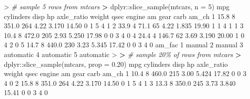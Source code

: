 \documentclass[
]{book}
\newenvironment{Shaded}{\begin{snugshade}}{\end{snugshade}}
\newcommand{\AttributeTok}[1]{\textcolor[rgb]{0.77,0.63,0.00}{#1}}
\newcommand{\CommentTok}[1]{\textcolor[rgb]{0.56,0.35,0.01}{\textit{#1}}}
\newcommand{\DecValTok}[1]{\textcolor[rgb]{0.00,0.00,0.81}{#1}}
\newcommand{\ErrorTok}[1]{\textcolor[rgb]{0.64,0.00,0.00}{\textbf{#1}}}
\newcommand{\FloatTok}[1]{\textcolor[rgb]{0.00,0.00,0.81}{#1}}
\newcommand{\FunctionTok}[1]{\textcolor[rgb]{0.00,0.00,0.00}{#1}}
\newcommand{\NormalTok}[1]{#1}
\newcommand{\SpecialCharTok}[1]{\textcolor[rgb]{0.00,0.00,0.00}{#1}}
\begin{document}
\begin{Shaded}
\begin{Highlighting}[]
\SpecialCharTok{\textgreater{}} \CommentTok{\# sample 5 rows from mtcars}
\ErrorTok{\textgreater{}}\NormalTok{ dplyr}\SpecialCharTok{::}\FunctionTok{slice\_sample}\NormalTok{(mtcars, }\AttributeTok{n =} \DecValTok{5}\NormalTok{)}
\NormalTok{   mpg cylinders  disp  hp axle\_ratio weight  qsec engine am gear carb am\_ch}
\DecValTok{1} \FloatTok{15.8}         \DecValTok{8} \FloatTok{351.0} \DecValTok{264}       \FloatTok{4.22}  \FloatTok{3.170} \FloatTok{14.50}      \DecValTok{0}  \DecValTok{1}    \DecValTok{5}    \DecValTok{4}     \DecValTok{1}
\DecValTok{2} \FloatTok{33.9}         \DecValTok{4}  \FloatTok{71.1}  \DecValTok{65}       \FloatTok{4.22}  \FloatTok{1.835} \FloatTok{19.90}      \DecValTok{1}  \DecValTok{1}    \DecValTok{4}    \DecValTok{1}     \DecValTok{1}
\DecValTok{3} \FloatTok{10.4}         \DecValTok{8} \FloatTok{472.0} \DecValTok{205}       \FloatTok{2.93}  \FloatTok{5.250} \FloatTok{17.98}      \DecValTok{0}  \DecValTok{0}    \DecValTok{3}    \DecValTok{4}     \DecValTok{0}
\DecValTok{4} \FloatTok{24.4}         \DecValTok{4} \FloatTok{146.7}  \DecValTok{62}       \FloatTok{3.69}  \FloatTok{3.190} \FloatTok{20.00}      \DecValTok{1}  \DecValTok{0}    \DecValTok{4}    \DecValTok{2}     \DecValTok{0}
\DecValTok{5} \FloatTok{14.7}         \DecValTok{8} \FloatTok{440.0} \DecValTok{230}       \FloatTok{3.23}  \FloatTok{5.345} \FloatTok{17.42}      \DecValTok{0}  \DecValTok{0}    \DecValTok{3}    \DecValTok{4}     \DecValTok{0}
\NormalTok{     am\_fac}
\DecValTok{1}\NormalTok{    manual}
\DecValTok{2}\NormalTok{    manual}
\DecValTok{3}\NormalTok{ automatic}
\DecValTok{4}\NormalTok{ automatic}
\DecValTok{5}\NormalTok{ automatic}
\SpecialCharTok{\textgreater{}} 
\ErrorTok{\textgreater{}} \CommentTok{\# sample 20\% of rows from mtcars}
\ErrorTok{\textgreater{}}\NormalTok{ dplyr}\SpecialCharTok{::}\FunctionTok{slice\_sample}\NormalTok{(mtcars, }\AttributeTok{prop =} \FloatTok{0.20}\NormalTok{)}
\NormalTok{   mpg cylinders  disp  hp axle\_ratio weight  qsec engine am gear carb am\_ch}
\DecValTok{1} \FloatTok{10.4}         \DecValTok{8} \FloatTok{460.0} \DecValTok{215}       \FloatTok{3.00}  \FloatTok{5.424} \FloatTok{17.82}      \DecValTok{0}  \DecValTok{0}    \DecValTok{3}    \DecValTok{4}     \DecValTok{0}
\DecValTok{2} \FloatTok{15.8}         \DecValTok{8} \FloatTok{351.0} \DecValTok{264}       \FloatTok{4.22}  \FloatTok{3.170} \FloatTok{14.50}      \DecValTok{0}  \DecValTok{1}    \DecValTok{5}    \DecValTok{4}     \DecValTok{1}
\DecValTok{3} \FloatTok{13.3}         \DecValTok{8} \FloatTok{350.0} \DecValTok{245}       \FloatTok{3.73}  \FloatTok{3.840} \FloatTok{15.41}      \DecValTok{0}  \DecValTok{0}    \DecValTok{3}    \DecValTok{4}     \DecValTok{0}

\end{Highlighting}
\end{Shaded}
\end{document}
